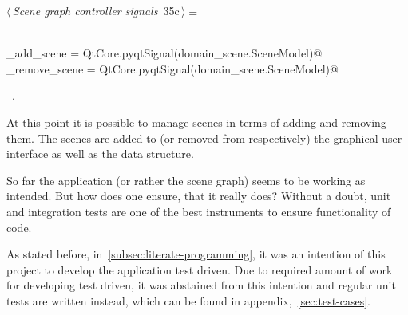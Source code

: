 \documentclass[
    a4paper,      %
    10pt,         %
    openright,    %
    notitlepage,  %
    parskip=half, %
]{scrreprt}       %
\theoremstyle{definition}                    %
\begin{document}
\begin{flushleft} \small
\begin{minipage}{\linewidth}\label{scrap41}\raggedright\small
{} $\langle\,${\itshape Scene graph controller signals}\nobreak\ {\footnotesize {35c}}$\,\rangle\equiv$
\vspace{-1ex}
\begin{list}{}{} \item
\mbox{}\lstinline@@\\
\mbox{}\lstinline@do_add_scene    = QtCore.pyqtSignal(domain_scene.SceneModel)@\\
\mbox{}\lstinline@do_remove_scene = QtCore.pyqtSignal(domain_scene.SceneModel)@\\
\mbox{}\lstinline@@{\NWsep}
\end{list}
\vspace{-1.5ex}
\footnotesize
\begin{list}{}{\setlength{\itemsep}{-\parsep}\setlength{\itemindent}{-\leftmargin}}
\item \NWtxtMacroRefIn\ .

\item{}
\end{list}
\end{minipage}\vspace{4ex}
\end{flushleft}


At this point it is possible to manage scenes in terms of adding and removing
them. The scenes are added to (or removed from respectively) the graphical user
interface as well as the data structure.

So far the application (or rather the scene graph) seems to be working as
intended. But how does one ensure, that it really does? Without a doubt, unit
and integration tests are one of the best instruments to ensure functionality of
code.

As stated before, in~\autoref{subsec:literate-programming}, it was an intention
of this project to develop the application test driven. Due to required amount
of work for developing test driven, it was abstained from this intention and
regular unit tests are written instead, which can be found in
appendix,~\autoref{sec:test-cases}.
\end{document}
